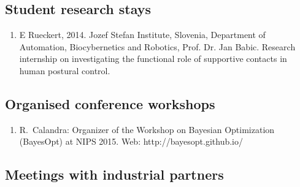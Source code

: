 \subsection{Student research stays}

\begin{enumerate}
 \item E Rueckert, 2014. Jozef Stefan Institute, Slovenia, Department of Automation, Biocybernetics and Robotics, Prof. Dr. Jan Babic. Research internship on investigating the functional role of supportive contacts in human postural control. 
\end{enumerate}

\subsection{Organised conference workshops}

\begin{enumerate}
\item  R.~Calandra: Organizer of the Workshop on Bayesian Optimization (BayesOpt) at NIPS 2015. Web: http://bayesopt.github.io/
\end{enumerate}


\subsection{Meetings with industrial partners}


